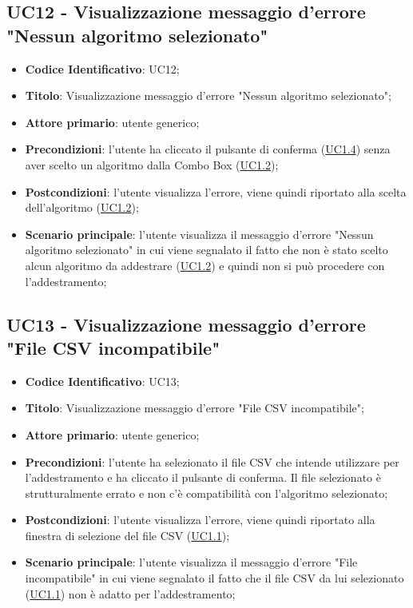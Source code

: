 	\label{par:UC12}
	\subsection{UC12 - Visualizzazione messaggio d'errore "Nessun algoritmo selezionato"}
		\begin{itemize}
			\item\textbf{Codice Identificativo}: UC12;
			\item\textbf{Titolo}: Visualizzazione messaggio d'errore "Nessun algoritmo selezionato";
			\item\textbf{Attore primario}: utente generico;
			\item\textbf{Precondizioni}: l'utente ha cliccato il pulsante di conferma (\hyperref[par:UC1.4]{UC1.4}) senza aver scelto un algoritmo dalla Combo Box (\hyperref[par:UC1.2]{UC1.2});
			\item\textbf{Postcondizioni}: l'utente visualizza l'errore, viene quindi riportato alla scelta dell'algoritmo (\hyperref[par:UC1.2]{UC1.2});
			\item\textbf{Scenario principale}: l'utente visualizza il messaggio d'errore "Nessun algoritmo selezionato" in cui viene segnalato il fatto che non è stato scelto alcun algoritmo da addestrare (\hyperref[par:UC1.2]{UC1.2}) e quindi non si può procedere con l'addestramento; 		
		\end{itemize}
		
	\label{par:UC13}
	\subsection{UC13 - Visualizzazione messaggio d'errore "File CSV incompatibile"}
		\begin{itemize}
			\item\textbf{Codice Identificativo}: UC13;
			\item\textbf{Titolo}: Visualizzazione messaggio d'errore "File CSV incompatibile";
			\item\textbf{Attore primario}: utente generico;
			\item\textbf{Precondizioni}: l'utente ha selezionato il file CSV che intende utilizzare per l'addestramento e ha cliccato il pulsante di conferma. Il file selezionato è strutturalmente errato e non c'è compatibilità con l'algoritmo selezionato;
			\item\textbf{Postcondizioni}: l'utente visualizza l'errore, viene quindi riportato alla finestra di selezione del file CSV (\hyperref[par:UC1.1]{UC1.1});
			\item\textbf{Scenario principale}: l'utente visualizza il messaggio d'errore "File incompatibile" in cui viene segnalato il fatto che il file CSV da lui selezionato (\hyperref[par:UC1.1]{UC1.1}) non è adatto per l'addestramento; 		
		\end{itemize}

